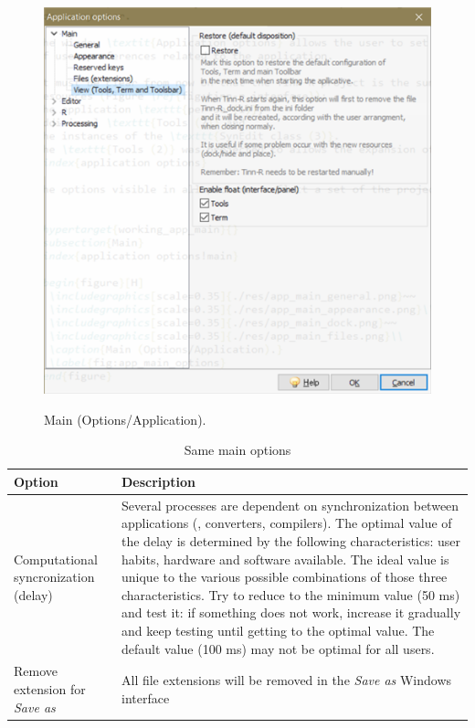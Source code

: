 \begin{figure}[H]
  \includegraphics[scale=0.45]{./res/app_main_view.png}\\
  \caption{Main (Options/Application).}
  \label{fig:app_main_options}
\end{figure}

\begin{table}
  \begin{footnotesize}
    \begin{tabularx}{\headwidth}{>{\hsize=0.35\hsize}X>{\hsize=0.65\hsize}X}\\
      \hline
      \textbf{Option} & \textbf{Description} \\
      \hline
      Computational syncronization (delay) & Several processes are dependent on synchronization between applications
       (\RR{}, converters, compilers). The optimal value of the delay is determined by the following characteristics:
       user habits, hardware and software available.
       The ideal value is unique to the various possible combinations of those three characteristics.
       Try to reduce to the minimum value (50 ms) and test it: if something does not work, increase it gradually
       and keep testing until getting to the optimal value. The default value (100 ms) may not be optimal for all users. \\
      Remove extension for \textit{Save as} & All file extensions will be removed
       in the \textit{Save as} Windows interface \\
      \hline
    \end{tabularx}
  \end{footnotesize}
  \caption{Same main options}
  \label{tab:app_main}
\end{table}

